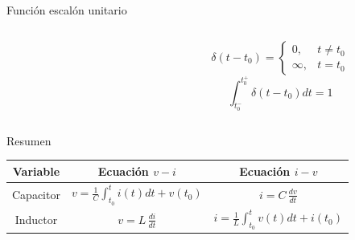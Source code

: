 \documentclass[aspectratio=169]{beamer}
\begin{document}
\begin{frame}{Función escalón unitario}
    \begin{columns}
    \begin{column}{0.5\textwidth}
        \centering
    \end{column}
    \centering
    \begin{column}{0.5\textwidth}
        \begin{equation*}
            \delta(t-t_0) =
            \begin{cases}
                0, & t \ne t_0\\
                \infty, & t = t_0
            \end{cases}
        \end{equation*}
        \vspace{0.5cm}
        \begin{equation*}
            \int_{t_0^-}^{t_0^+} \delta(t-t_0)dt = 1
        \end{equation*}
    \end{column}
\end{columns}
\end{frame}

\begin{frame}{Resumen}
    \begin{center}
        \begin{tabularx}{14cm}{C C C}
        \toprule
        Variable & Ecuación $v-i$ & Ecuación $i-v$ \\
        \midrule
       Capacitor & $v=\frac{1}{C}\int_{t_0}^{t} i(t)dt + v(t_0) $ & $i = C\,\frac{dv}{dt}$ \\[5pt]
        Inductor & $v = L\,\frac{di}{dt}$ & $i=\frac{1}{L}\int_{t_0}^{t} v(t)dt + i(t_0) $\\[5pt]
        \bottomrule
        \end{tabularx}   
    \end{center}
\end{frame}



% 

% 

\end{document}
